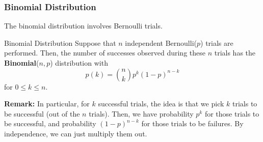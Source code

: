 \subsubsection{Binomial Distribution}
The binomial distribution involves Bernoulli trials. 
\begin{definition}{Binomial Distribution}{}
    Suppose that $n$ independent Bernoulli($p$) trials are performed. Then, the number of successes observed during these $n$ trials has the \textbf{Binomial}($n, p$) distribution with 
    \[p(k) = \binom{n}{k} p^k (1 - p)^{n - k}\]
    for $0 \leq k \leq n$. 
\end{definition}
\textbf{Remark:} In particular, for $k$ successful trials, the idea is that we pick $k$ trials to be successful (out of the $n$ trials). Then, we have probability $p^k$ for those trials to be successful, and probability $(1 - p)^{n - k}$ for those trials to be failures. By independence, we can just multiply them out. 

